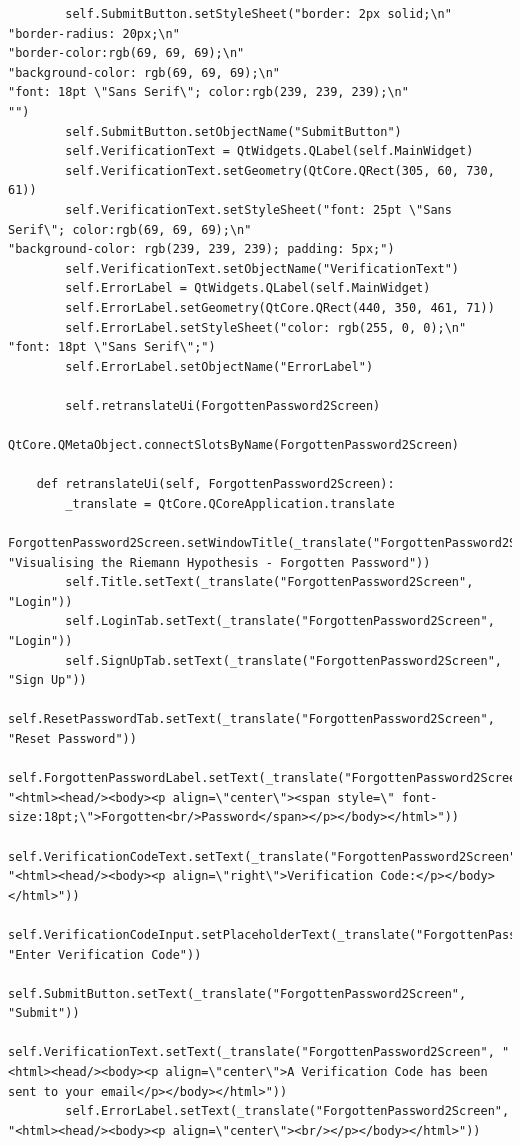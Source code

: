 \documentclass[12pt]{article}
\begin{document}
\begin{lstlisting}
        self.SubmitButton.setStyleSheet("border: 2px solid;\n"
"border-radius: 20px;\n"
"border-color:rgb(69, 69, 69);\n"
"background-color: rgb(69, 69, 69);\n"
"font: 18pt \"Sans Serif\"; color:rgb(239, 239, 239);\n"
"")
        self.SubmitButton.setObjectName("SubmitButton")
        self.VerificationText = QtWidgets.QLabel(self.MainWidget)
        self.VerificationText.setGeometry(QtCore.QRect(305, 60, 730, 61))
        self.VerificationText.setStyleSheet("font: 25pt \"Sans Serif\"; color:rgb(69, 69, 69);\n"
"background-color: rgb(239, 239, 239); padding: 5px;")
        self.VerificationText.setObjectName("VerificationText")
        self.ErrorLabel = QtWidgets.QLabel(self.MainWidget)
        self.ErrorLabel.setGeometry(QtCore.QRect(440, 350, 461, 71))
        self.ErrorLabel.setStyleSheet("color: rgb(255, 0, 0);\n"
"font: 18pt \"Sans Serif\";")
        self.ErrorLabel.setObjectName("ErrorLabel")

        self.retranslateUi(ForgottenPassword2Screen)
        QtCore.QMetaObject.connectSlotsByName(ForgottenPassword2Screen)

    def retranslateUi(self, ForgottenPassword2Screen):
        _translate = QtCore.QCoreApplication.translate
        ForgottenPassword2Screen.setWindowTitle(_translate("ForgottenPassword2Screen", "Visualising the Riemann Hypothesis - Forgotten Password"))
        self.Title.setText(_translate("ForgottenPassword2Screen", "Login"))
        self.LoginTab.setText(_translate("ForgottenPassword2Screen", "Login"))
        self.SignUpTab.setText(_translate("ForgottenPassword2Screen", "Sign Up"))
        self.ResetPasswordTab.setText(_translate("ForgottenPassword2Screen", "Reset Password"))
        self.ForgottenPasswordLabel.setText(_translate("ForgottenPassword2Screen", "<html><head/><body><p align=\"center\"><span style=\" font-size:18pt;\">Forgotten<br/>Password</span></p></body></html>"))
        self.VerificationCodeText.setText(_translate("ForgottenPassword2Screen", "<html><head/><body><p align=\"right\">Verification Code:</p></body></html>"))
        self.VerificationCodeInput.setPlaceholderText(_translate("ForgottenPassword2Screen", "Enter Verification Code"))
        self.SubmitButton.setText(_translate("ForgottenPassword2Screen", "Submit"))
        self.VerificationText.setText(_translate("ForgottenPassword2Screen", "<html><head/><body><p align=\"center\">A Verification Code has been sent to your email</p></body></html>"))
        self.ErrorLabel.setText(_translate("ForgottenPassword2Screen", "<html><head/><body><p align=\"center\"><br/></p></body></html>"))
\end{lstlisting}
\end{document}
